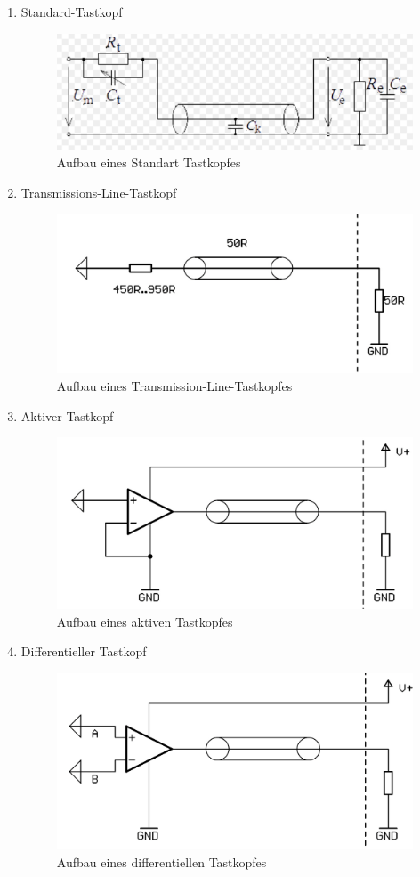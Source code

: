         \begin{enumerate}

        \item Standard-Tastkopf
            \begin{figure}[h!]
                \centering
                \includegraphics[]{111.PNG}
                \caption{Aufbau eines Standart Tastkopfes~\cite{tastkopf_standard}}
            \end{figure}

        \item Transmissions-Line-Tastkopf
            \begin{figure}[h!]
                \centering
                \includegraphics[width=0.5\linewidth]{112.PNG}
                \caption{Aufbau eines Transmission-Line-Tastkopfes~\cite{transmission_line_probe}}
            \end{figure}
        \newpage
        \item Aktiver Tastkopf
            \begin{figure}[h!]
                \centering
                \includegraphics[width=0.5\linewidth]{113.PNG}
                \caption{Aufbau eines aktiven Tastkopfes~\cite{active_probe}}
            \end{figure}

        \item Differentieller Tastkopf
            \begin{figure}[h!]
                \centering
                \includegraphics[width=0.5\linewidth]{114.PNG}
                \caption{Aufbau eines differentiellen Tastkopfes~\cite{differential_probe}}
            \end{figure}

        \end{enumerate}


